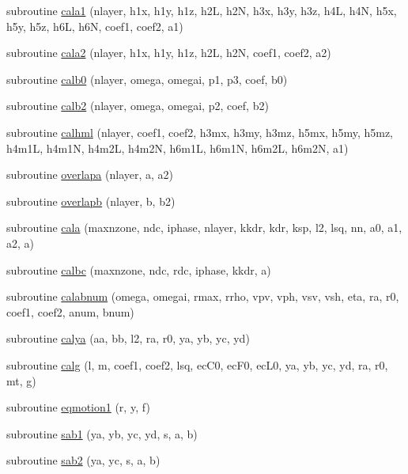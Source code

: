 \begin{DoxyCompactItemize}
\item 
subroutine \hyperlink{calmat_8f90_a1cf414ae5d3c57d2a5d8867d9a9e4c4f}{cala1} (nlayer, h1x, h1y, h1z, h2\-L, h2\-N, h3x, h3y, h3z, h4\-L, h4\-N, h5x, h5y, h5z, h6\-L, h6\-N, coef1, coef2, a1)
\item 
subroutine \hyperlink{calmat_8f90_afedf52bd8a48cc1591106bbb0e47f224}{cala2} (nlayer, h1x, h1y, h1z, h2\-L, h2\-N, coef1, coef2, a2)
\item 
subroutine \hyperlink{calmat_8f90_a49f61f2f277f2cd8f76d7b2b53b9dba2}{calb0} (nlayer, omega, omegai, p1, p3, coef, b0)
\item 
subroutine \hyperlink{calmat_8f90_a5a5718c4579665d804df10d7e7eb4d3a}{calb2} (nlayer, omega, omegai, p2, coef, b2)
\item 
subroutine \hyperlink{calmat_8f90_ab9849ae17c2d283dff1b893c6e1203f2}{calhml} (nlayer, coef1, coef2, h3mx, h3my, h3mz, h5mx, h5my, h5mz, h4m1\-L, h4m1\-N, h4m2\-L, h4m2\-N, h6m1\-L, h6m1\-N, h6m2\-L, h6m2\-N, a1)
\item 
subroutine \hyperlink{calmat_8f90_a668f5060f012a502aa862757a58c6b3e}{overlapa} (nlayer, a, a2)
\item 
subroutine \hyperlink{calmat_8f90_abf3dacfca5582156fb7cdd2b27fcad30}{overlapb} (nlayer, b, b2)
\item 
subroutine \hyperlink{calmat_8f90_a509291cbf4c7203c1f955e34cc650037}{cala} (maxnzone, ndc, iphase, nlayer, kkdr, kdr, ksp, l2, lsq, nn, a0, a1, a2, a)
\item 
subroutine \hyperlink{calmat_8f90_a9177670db40a196704eb6aa1181d6ff7}{calbc} (maxnzone, ndc, rdc, iphase, kkdr, a)
\item 
subroutine \hyperlink{calmat_8f90_a7de6b803f712f5857f74b0c1a717882a}{calabnum} (omega, omegai, rmax, rrho, vpv, vph, vsv, vsh, eta, ra, r0, coef1, coef2, anum, bnum)
\item 
subroutine \hyperlink{calmat_8f90_ac5f21a72ea4e463a894c12a1fe117c8a}{calya} (aa, bb, l2, ra, r0, ya, yb, yc, yd)
\item 
subroutine \hyperlink{calmat_8f90_a3fc57af2a47467837471dbf6477a12cc}{calg} (l, m, coef1, coef2, lsq, ec\-C0, ec\-F0, ec\-L0, ya, yb, yc, yd, ra, r0, mt, g)
\item 
subroutine \hyperlink{calmat_8f90_a7cb09ea68bc59247cbe2d73c30a6755f}{eqmotion1} (r, y, f)
\item 
subroutine \hyperlink{calmat_8f90_a6d8651647177331a35d12dc02443eb45}{sab1} (ya, yb, yc, yd, s, a, b)
\item 
subroutine \hyperlink{calmat_8f90_a9f48241a00a0813f19ab0d4aa1f94bec}{sab2} (ya, yc, s, a, b)

\end{DoxyCompactItemize}
